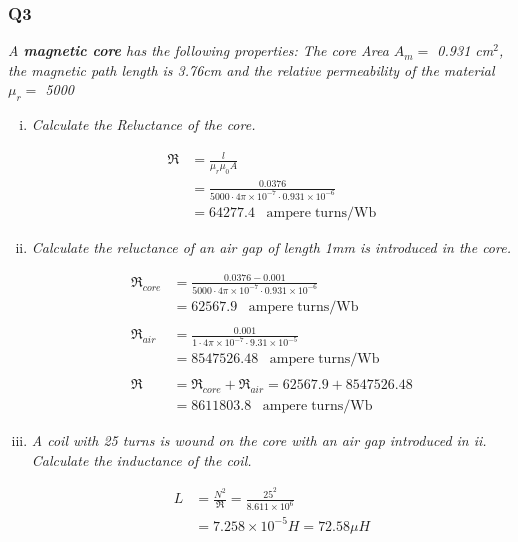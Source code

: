 \documentclass[a4paper,11pt]{article}
\begin{document}
\newpage
\subsubsection*{Q3}
\textit{A \textbf{magnetic core} has the following properties: The core Area $A_m = $ 0.931 cm$^2$, the magnetic path length is 3.76cm and the relative permeability of the material $\mu_r = $ 5000 }

\begin{enumerate}[i.]
    \item \textit{Calculate the Reluctance of the core.}

          \begin{align*}
              \mathfrak{R} & = \frac{l}{\mu_{r}\mu_{0}A}                                          \\
                           & = \frac{0.0376}{5000 \cdot 4\pi\times10^{-7}\cdot0.931\times10^{-6}} \\
                           & = 64277.4\;\;\;\mathrm{ampere \; turns/Wb}
          \end{align*}


    \item \textit{Calculate the reluctance of an air gap of length 1mm is introduced in the core.}
    
    \begin{align*}
        \mathfrak{R}_{core} &= \frac{0.0376 - 0.001}{5000\cdot 4\pi\times10^{-7}\cdot 0.931\times 10^{-6}} \\
        &= 62567.9 \;\;\;\mathrm{ampere \; turns/Wb}\\\\
        \mathfrak{R}_{air} &= \frac{0.001}{1\cdot 4\pi\times10^{-7}\cdot 9.31\times 10^{-5}} \\
        &= 8547526.48 \;\;\;\mathrm{ampere \; turns/Wb}\\\\
        \mathfrak{R} &= \mathfrak{R}_{core} +\mathfrak{R}_{air} = 62567.9 + 8547526.48\\
        &= 8611803.8 \;\;\;\mathrm{ampere \; turns/Wb}
    \end{align*}



    \item \textit{A coil with 25 turns is wound on the core with an air gap introduced in ii. Calculate the inductance of the coil.}

    \begin{align*}
        L &= \frac{N^2}{\mathfrak{R}} = \frac{25^2}{8.611\times 10^6}\\
        &= 7.258\times 10^{-5}H = 72.58\mu H
    \end{align*}


\end{enumerate}
\end{document}
